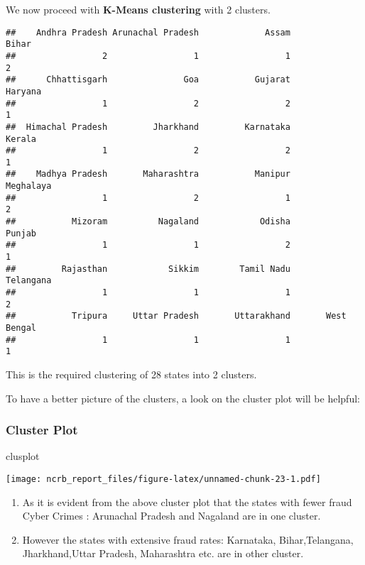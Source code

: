 \documentclass[
  12,
  a4paper,
]{report}
\newenvironment{Shaded}{\begin{snugshade}}{\end{snugshade}}
\newcommand{\NormalTok}[1]{#1}
\newcommand{\SpecialCharTok}[1]{\textcolor[rgb]{0.81,0.36,0.00}{\textbf{#1}}}
\begin{document}
We now proceed with \textbf{K-Means clustering} with 2 clusters.

\begin{Shaded}
\end{Shaded}

\begin{verbatim}
##    Andhra Pradesh Arunachal Pradesh             Assam             Bihar 
##                 2                 1                 1                 2 
##      Chhattisgarh               Goa           Gujarat           Haryana 
##                 1                 2                 2                 1 
##  Himachal Pradesh         Jharkhand         Karnataka            Kerala 
##                 1                 2                 2                 1 
##    Madhya Pradesh       Maharashtra           Manipur         Meghalaya 
##                 1                 2                 1                 2 
##           Mizoram          Nagaland            Odisha            Punjab 
##                 1                 1                 2                 1 
##         Rajasthan            Sikkim        Tamil Nadu         Telangana 
##                 1                 1                 1                 2 
##           Tripura     Uttar Pradesh       Uttarakhand       West Bengal 
##                 1                 1                 1                 1
\end{verbatim}

This is the required clustering of 28 states into 2 clusters.

To have a better picture of the clusters, a look on the cluster plot
will be helpful:

\hypertarget{cluster-plot}{%
\subsubsection{Cluster Plot}\label{cluster-plot}}

\begin{Shaded}
\begin{Highlighting}[]
\NormalTok{clusplot}
\end{Highlighting}
\end{Shaded}

\texttt{[image: ncrb\_report\_files/figure-latex/unnamed-chunk-23-1.pdf]}

\begin{enumerate}
\def\labelenumi{\arabic{enumi}.}
\item
  As it is evident from the above cluster plot that the states with
  fewer fraud Cyber Crimes : Arunachal Pradesh and Nagaland are in one
  cluster.
\item
  However the states with extensive fraud rates: Karnataka,
  Bihar,Telangana, Jharkhand,Uttar Pradesh, Maharashtra etc. are in
  other cluster.
\end{enumerate}
\end{document}
